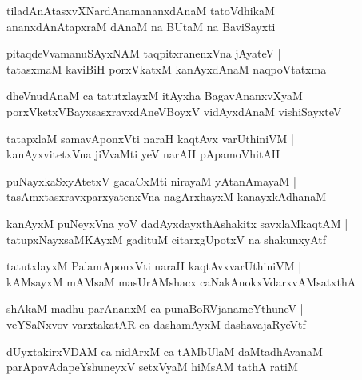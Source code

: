 \documentclass[twoside,12pt,openright]{book}
\newcounter{shloka}[chapter]
\begin{document}
\begin{shloka}%
tiladAnAtasxvXNardAnamananxdAnaM tatoVdhikaM |\\
ananxdAnAtapxraM dAnaM na BUtaM na BaviSayxti 
\end{shloka}

\begin{shloka}%
pitaqdeVvamanuSAyxNAM taqpitxranenxVna jAyateV |\\
tatasxmaM kaviBiH porxVkatxM kanAyxdAnaM naqpoVtatxma
\end{shloka}

\begin{shloka}%
dheVnudAnaM ca tatutxlayxM itAyxha BagavAnanxvXyaM |\\
porxVketxVBayxsasxravxdAneVBoyxV vidAyxdAnaM vishiSayxteV 
\end{shloka}

\begin{shloka}%
tatapxlaM samavAponxVti naraH kaqtAvx varUthiniVM |\\
kanAyxvitetxVna jiVvaMti yeV narAH pApamoVhitAH 
\end{shloka}

\begin{shloka}%
puNayxkaSxyAtetxV gacaCxMti nirayaM yAtanAmayaM |\\
tasAmxtasxravxparxyatenxVna nagArxhayxM kanayxkAdhanaM
\end{shloka}

\begin{shloka}%
kanAyxM puNeyxVna yoV dadAyxdayxthAshakitx savxlaMkaqtAM |\\
tatupxNayxsaMKAyxM gadituM citarxgUpotxV na shakunxyAtf 
\end{shloka}

\begin{shloka}%
tatutxlayxM PalamAponxVti naraH kaqtAvxvarUthiniVM |\\
kAMsayxM mAMsaM masUrAMshacx caNakAnokxVdarxvAMsatxthA
\end{shloka}

\begin{shloka}%
shAkaM madhu parAnanxM ca punaBoRVjanameYthuneV |\\
veYSaNxvov varxtakatAR ca dashamAyxM dashavajaRyeVtf
\end{shloka}

\begin{shloka}%
dUyxtakirxVDAM ca nidArxM ca tAMbUlaM daMtadhAvanaM |\\
parApavAdapeYshuneyxV setxVyaM hiMsAM tathA ratiM 
\end{shloka}
\end{document}
